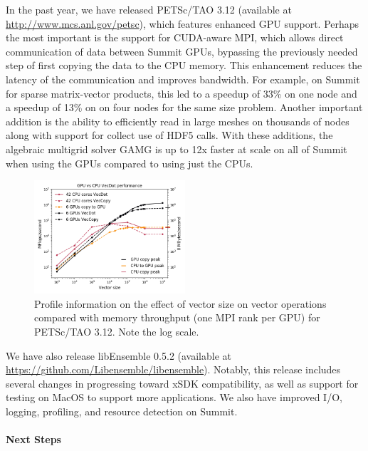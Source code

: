 In the past year, we have released PETSc/TAO 3.12 (available at \url{http://www.mcs.anl.gov/petsc}),
which features enhanced GPU support.  Perhaps the most important is the support for CUDA-aware 
MPI, which allows direct communication of data between Summit GPUs, bypassing the previously 
needed step of first copying the data to the CPU memory. This enhancement reduces the latency 
of the communication and improves bandwidth. For example, on Summit for sparse matrix-vector 
products, this led to a speedup of 33\% on one node and a speedup of 13\% on on four nodes 
for the same size problem. Another important addition is the ability to efficiently read 
in large meshes on thousands of nodes along with support for collect use of HDF5 calls. 
With these additions, the algebraic multigrid solver GAMG is up to 12x faster at scale 
on all of Summit when using the GPUs compared to using just the CPUs.

\begin{figure}
\centering
\includegraphics[width=0.5\textwidth]{projects/2.3.3-MathLibs/2.3.3.06-PETSc-TAO/petsc_profile}
\caption{Profile information on the effect of vector size on vector operations compared with 
memory throughput (one MPI rank per GPU) for PETSc/TAO 3.12. Note the log scale.}
\label{fig:petsc-tao-fig}
\end{figure}

We have also release libEnsemble 0.5.2 (available at \url{https://github.com/Libensemble/libensemble}).
Notably, this release includes several changes in progressing toward xSDK compatibility, as well as
support for testing on MacOS to support more applications.  We also have improved I/O, logging, 
profiling, and resource detection on Summit.

\paragraph{Next Steps}

